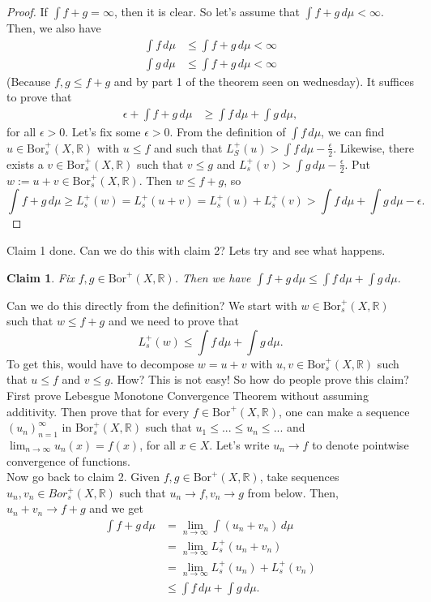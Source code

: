 \documentclass[letterpaper, 12pt]{article}
\newcommand{\bR}{\mathbb{R}}
\theoremstyle{stdthm}
\theoremstyle{stddef}
\theoremstyle{stdnonum}
\newtheorem{claim}{Claim}
\theoremstyle{stdqands}
\theoremstyle{stdbold}
\begin{document}
\begin{proof}
If $\int f + g = \infty$, then it is clear. So let's assume that  $\int f+g \, d\mu < \infty$. Then, we also have 
\begin{align*}
\int f \, d\mu &\leq \int f +g \, d\mu < \infty\\
\int g\,  d\mu &\leq \int f +g \, d\mu < \infty
\end{align*}
(Because $f,g \leq f+g$ and by part 1 of the theorem seen on wednesday). It suffices to prove that 
\begin{align*}
\epsilon + \int f + g \, d\mu &\geq \int f \, d\mu + \int g \, d\mu,
\end{align*}
for all $\epsilon>0$. Let's fix some $\epsilon >0$. From the definition of $\int f \, d\mu$, we can find $u \in \mathrm{Bor}_s^+(X,\bR)$ with $u \leq f$ and such that $L_S^+(u) > \int f \, d\mu - \frac{\epsilon}{2}$. Likewise, there exists a $v \in \mathrm{Bor}_s^+(X,\bR)$ such that $v \leq g$ and $L_s^+(v) > \int g \, d\mu  - \frac{\epsilon}{2}$. Put $w:= u + v \in \mathrm{Bor}_s^+(X,\bR)$. Then $w \leq f + g$, so 
\[
\int f + g \, d\mu \geq L_s^+(w) 
= L_s^+ (u+v)
= L_s^+(u) + L_s^+(v)
>  \int f \, d\mu  +  \int g \, d\mu  - \epsilon.
\] 
\end{proof}
\noindent Claim 1 done. Can we do this with claim 2? Lets try and see what happens.

\begin{claim}
Fix $f,g \in \mathrm{Bor}^+(X,\bR)$. Then we have $\int f+g \, d \mu \leq \int f \, d\mu + \int g \, d\mu$. 
\end{claim}
\noindent Can we do this directly from the definition? We start with $w \in \mathrm{Bor}_s^+(X,\bR)$ such that $w \leq f +g$ and we need to prove that
\[
L_s^+ (w) \leq  \int f \, d\mu  + \int g \, d\mu.
\]
To get this, would have to decompose $w = u+v$ with $u,v \in \mathrm{Bor}_s^+(X,\bR)$ such that $u \leq f$ and  $v \leq g$. How? This is not easy! So how do people prove this claim? First prove Lebesgue Monotone Convergence Theorem without assuming additivity. Then prove that for every $f \in \mathrm{Bor}^+(X,\bR)$, one can make a sequence $(u_n)_{n=1}^\infty$ in $\mathrm{Bor}_s^+(X,\bR)$ such that $u_1 \leq ...\leq u_n \leq...$ and $\lim_{n \rightarrow \infty} u_n(x) = f(x)$, for all $x \in X$.  Let's write $u_n \rightarrow f$ to denote pointwise convergence of functions.\\
Now go back to claim 2. Given $f,g \in \mathrm{Bor}^+(X,\bR)$, take sequences $u_n,v_n \in Bor_s^+(X,\bR)$ such that $u_n \rightarrow f, v_n \rightarrow g$ from below. Then, $u_n + v_n \rightarrow f + g$ and we get 
\begin{align*}
\int f+g \, d \mu &= \lim_{n\rightarrow \infty} \int (u_n + v_n) \, d\mu\\
&= \lim_{n\rightarrow \infty} L_s^+ (u_n + v_n) \\
&= \lim_{n\rightarrow \infty} L_s^+(u_n) + L_s^+(v_n)\\
&\leq \int f \,  d\mu + \int g \, d\mu.
\end{align*}
\end{document}
